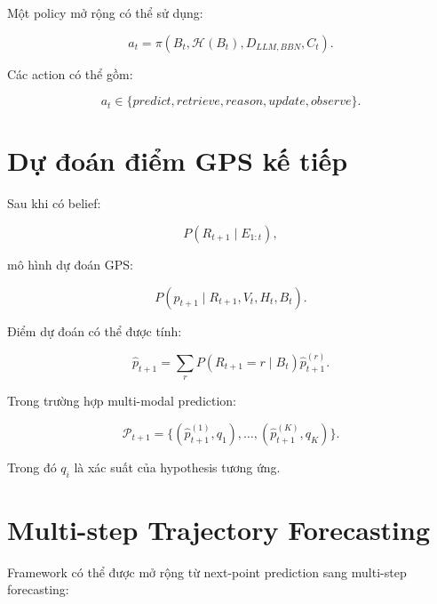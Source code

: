 \documentclass[11pt,a4paper]{article}
\begin{document}
	Một policy mở rộng có thể sử dụng:
	
	\begin{equation}
		a_t
		=
		\pi
		(
		B_t,
		\mathcal{H}(B_t),
		D_{LLM,BBN},
		C_t
		).
	\end{equation}
	
	Các action có thể gồm:
	
	\begin{equation}
		a_t
		\in
		\{
		predict,
		retrieve,
		reason,
		update,
		observe
		\}.
	\end{equation}
	
	\section{Dự đoán điểm GPS kế tiếp}
	
	Sau khi có belief:
	
	\begin{equation}
		P(R_{t+1}\mid E_{1:t}),
	\end{equation}
	
	mô hình dự đoán GPS:
	
	\begin{equation}
		P(
		p_{t+1}
		\mid
		R_{t+1},
		V_t,
		H_t,
		B_t
		).
	\end{equation}
	
	Điểm dự đoán có thể được tính:
	
	\begin{equation}
		\hat{p}_{t+1}
		=
		\sum_{r}
		P(R_{t+1}=r\mid B_t)
		\hat{p}_{t+1}^{(r)}.
	\end{equation}
	
	Trong trường hợp multi-modal prediction:
	
	\begin{equation}
		\mathcal{P}_{t+1}
		=
		\{
		(
		\hat{p}_{t+1}^{(1)},q_1),
		\ldots,
		(
		\hat{p}_{t+1}^{(K)},q_K)
		\}.
	\end{equation}
	
	Trong đó $q_i$ là xác suất của hypothesis tương ứng.
	
	\section{Multi-step Trajectory Forecasting}
	
	Framework có thể được mở rộng từ next-point prediction sang multi-step
	forecasting:
	
\end{document}

